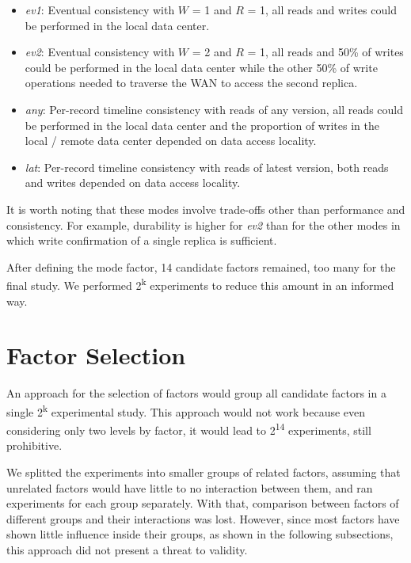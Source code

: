\documentclass[doublespacing]{bmcart}
\begin{document}
\begin{itemize}

\item \textit{ev1}: Eventual consistency with $W$ = 1 and $R$ = 1, all reads and writes could be performed in the local data
center.

\item \textit{ev2}: Eventual consistency with $W$ = 2 and $R$ = 1, all reads and 50\% of writes could be performed in the
local data center while the other 50\% of write operations needed to traverse
the WAN to access the second replica.

\item \textit{any}: Per-record timeline consistency with reads of any version, all reads could be performed in the local data center and
the proportion of writes in the local / remote data center depended on data
access locality.

\item \textit{lat}: Per-record timeline consistency with reads of latest version, both reads and writes depended on data access locality.

\end{itemize}

It is worth noting that these modes involve trade-offs other than performance
and consistency. For example, durability is higher for \textit{ev2} than for
the other modes in which write confirmation of a single replica is sufficient.

After defining the mode factor, 14 candidate factors remained, too many for the
final study. We performed 2\textsuperscript{k} experiments to reduce this
amount in an informed way.

\section{Factor Selection}

An approach for the selection of factors would group all candidate factors in a
single 2\textsuperscript{k} experimental study. This approach would not work
because even considering only two levels by factor, it would lead to
2\textsuperscript{14} experiments, still prohibitive.

We splitted the experiments into smaller groups of related factors, assuming
that unrelated factors would have little to no interaction between them, and
ran experiments for each group separately. With that, comparison between
factors of different groups and their interactions was lost. However, since
most factors have shown little influence inside their groups, as shown in the
following subsections, this approach did not present a threat to validity.
\end{document}

